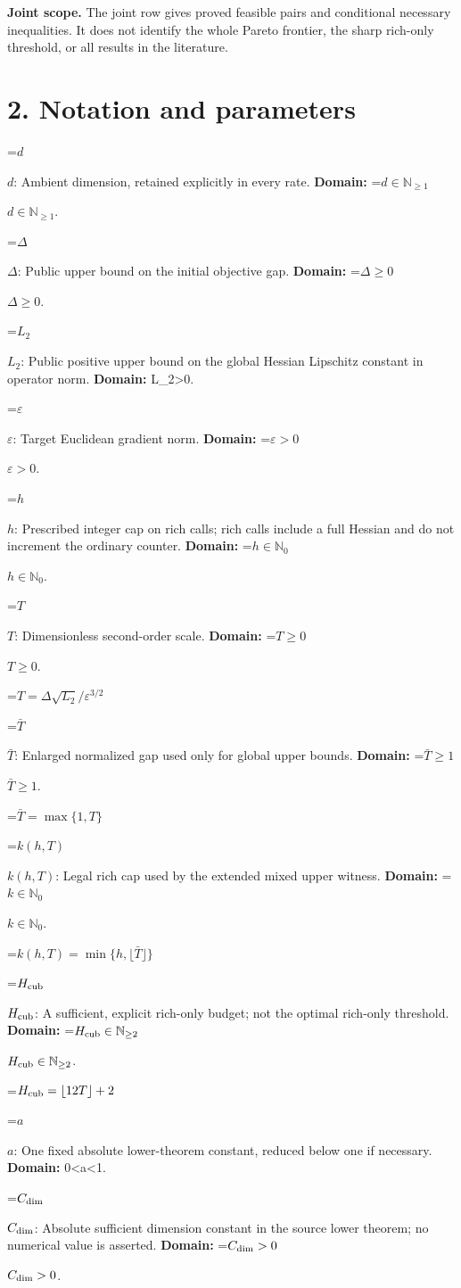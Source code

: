 \documentclass[10pt,a4paper]{article}
\newcommand{\AtlasMath}[1]{\par\begingroup\centering\setbox0=\hbox{$\displaystyle #1$}\ifdim\wd0>1.4\linewidth\typeout{ATLAS WIDE FORMULA: \the\wd0}\fi\ifdim\wd0>\linewidth\resizebox{\linewidth}{!}{\box0}\else\box0\fi\par\endgroup}
\newcommand{\AtlasInlineMath}[1]{\begingroup\setbox0=\hbox{$#1$}\ifdim\wd0>.4\linewidth\endgroup\AtlasMath{#1}\else\endgroup$#1$\fi}
\begin{document}
\textbf{Joint scope.} The joint row gives proved feasible pairs and conditional necessary inequalities. It does not identify the whole Pareto frontier, the sharp rich-only threshold, or all results in the literature.

\section{2. Notation and parameters}
\AtlasInlineMath{d}: Ambient dimension, retained explicitly in every rate. \textbf{Domain:} \AtlasInlineMath{d\in\mathbb N_{\ge1}}.

\AtlasInlineMath{\Delta}: Public upper bound on the initial objective gap. \textbf{Domain:} \AtlasInlineMath{\Delta\ge0}.

\AtlasInlineMath{L_2}: Public positive upper bound on the global Hessian Lipschitz constant in operator norm. \textbf{Domain:} L\_2>0.

\AtlasInlineMath{\varepsilon}: Target Euclidean gradient norm. \textbf{Domain:} \AtlasInlineMath{\varepsilon>0}.

\AtlasInlineMath{h}: Prescribed integer cap on rich calls; rich calls include a full Hessian and do not increment the ordinary counter. \textbf{Domain:} \AtlasInlineMath{h\in\mathbb N_0}.

\AtlasInlineMath{T}: Dimensionless second-order scale. \textbf{Domain:} \AtlasInlineMath{T\ge0}.

\AtlasMath{T=\Delta\sqrt{L_2}/\varepsilon^{3/2}}
\AtlasInlineMath{\bar T}: Enlarged normalized gap used only for global upper bounds. \textbf{Domain:} \AtlasInlineMath{\bar T\ge1}.

\AtlasMath{\bar T=\max\{1,T\}}
\AtlasInlineMath{k(h,T)}: Legal rich cap used by the extended mixed upper witness. \textbf{Domain:} \AtlasInlineMath{k\in\mathbb N_0}.

\AtlasMath{k(h,T)=\min\{h,\lfloor\bar T\rfloor\}}
\AtlasInlineMath{H_{\rm cub}}: A sufficient, explicit rich-only budget; not the optimal rich-only threshold. \textbf{Domain:} \AtlasInlineMath{H_{\rm cub}\in\mathbb N_{\ge2}}.

\AtlasMath{H_{\rm cub}=\lfloor12T\rfloor+2}
\AtlasInlineMath{a}: One fixed absolute lower-theorem constant, reduced below one if necessary. \textbf{Domain:} 0<a<1.

\AtlasInlineMath{C_{\rm dim}}: Absolute sufficient dimension constant in the source lower theorem; no numerical value is asserted. \textbf{Domain:} \AtlasInlineMath{C_{\rm dim}>0}.
\end{document}
